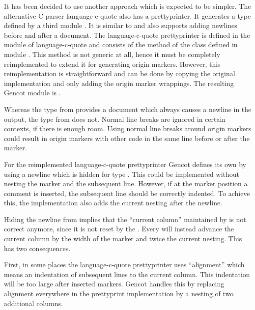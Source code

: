 It has been decided to use another approach which is expected to be simpler. The alternative C parser language-c-quote 
also has a prettyprinter. It generates a type  defined by a third module .
It is similar to  and also supports adding newlines before and after a document.
The language-c-quote prettyprinter is defined in the module  of language-c-quote and consists
of the method  of the class  defined in module .
This method is not generic at all, hence it must be completely reimplemented to extend it for generating origin 
markers. However, this reimplementation is straightforward and can be done by copying the original implementation
and only adding the origin marker wrappings. The resulting Gencot module is .

Whereas the type  from  provides a  document which always
causes a newline in the output, the type  from  does not. Normal line breaks
are ignored in certain contexts, if there is enough room. Using normal line breaks around origin markers could result
in origin markers with other code in the same line before or after the marker.

For the reimplemented language-c-quote prettyprinter Gencot defines its own  by using a newline 
which is hidden for type . This could be implemented without nesting the marker and the subsequent line.
However, if at the marker position a comment is inserted, the subsequent line should be correctly indented.
To achieve this, the  implementation also adds the current nesting after the newline.

Hiding the newline from  implies that the ``current column'' maintained by  is not
correct anymore, since it is not reset by the . Every  will instead advance the current
column by the width of the marker and twice the current nesting. This has two consequences.

First, in some places the language-c-quote prettyprinter uses ``alignment'' which means an indentation of subsequent lines
to the current column. This indentation will be too large after inserted markers. Gencot handles this by replacing 
alignment everywhere in the prettyprint implementation by a nesting of two additional columns. 

